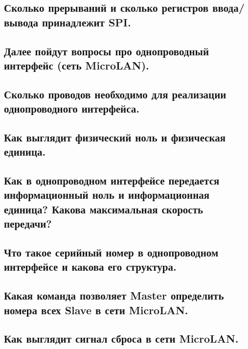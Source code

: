 \subsection{Сколько прерываний и сколько регистров ввода/вывода принадлежит SPI.}


\subsection{Далее пойдут вопросы про однопроводный интерфейс (сеть MicroLAN).}


\subsection{Сколько проводов необходимо для реализации однопроводного интерфейса.}


\subsection{Как выглядит физический ноль и физическая единица.}


\subsection{Как в однопроводном интерфейсе передается информационный ноль и информационная единица? Какова максимальная скорость  передачи?}


\subsection{Что такое серийный номер в однопроводном интерфейсе и какова его структура.}


\subsection{Какая команда позволяет Master определить номера всех Slave в сети MicroLAN.}


\subsection{Как выглядит сигнал сброса в сети MicroLAN.}


